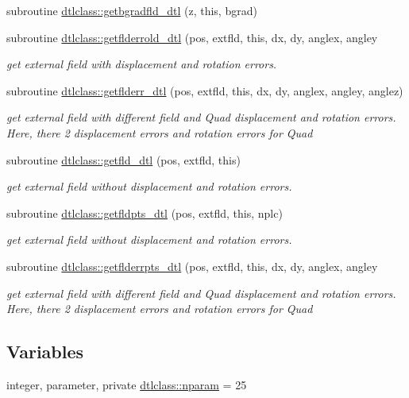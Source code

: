 \begin{DoxyCompactItemize}
subroutine \mbox{\hyperlink{namespacedtlclass_a79f0618eb609338c97470f6f8f05a848}{dtlclass\+::getbgradfld\+\_\+dtl}} (z, this, bgrad)
\item 
subroutine \mbox{\hyperlink{namespacedtlclass_aa42e9d402234d9be025275b620c42326}{dtlclass\+::getflderrold\+\_\+dtl}} (pos, extfld, this, dx, dy, anglex, angley
\begin{DoxyCompactList}\small\item\em get external field with displacement and rotation errors. \end{DoxyCompactList}\item 
subroutine \mbox{\hyperlink{namespacedtlclass_ab866f108c00b307f9e7a55731eadafa4}{dtlclass\+::getflderr\+\_\+dtl}} (pos, extfld, this, dx, dy, anglex, angley, anglez)
\begin{DoxyCompactList}\small\item\em get external field with different field and Quad displacement and rotation errors. Here, there 2 displacement errors and rotation errors for Quad \end{DoxyCompactList}\item 
subroutine \mbox{\hyperlink{namespacedtlclass_a9e97d93c8f7ec49afee134e3ffd3f900}{dtlclass\+::getfld\+\_\+dtl}} (pos, extfld, this)
\begin{DoxyCompactList}\small\item\em get external field without displacement and rotation errors. \end{DoxyCompactList}\item 
subroutine \mbox{\hyperlink{namespacedtlclass_ad87e70265bf1286abf4b2976d8ac37ac}{dtlclass\+::getfldpts\+\_\+dtl}} (pos, extfld, this, nplc)
\begin{DoxyCompactList}\small\item\em get external field without displacement and rotation errors. \end{DoxyCompactList}\item 
subroutine \mbox{\hyperlink{namespacedtlclass_a34e4fef41e0eab9b94f596f73059c2b7}{dtlclass\+::getflderrpts\+\_\+dtl}} (pos, extfld, this, dx, dy, anglex, angley
\begin{DoxyCompactList}\small\item\em get external field with different field and Quad displacement and rotation errors. Here, there 2 displacement errors and rotation errors for Quad \end{DoxyCompactList}\end{DoxyCompactItemize}
\subsection*{Variables}
\begin{DoxyCompactItemize}
\item 
integer, parameter, private \mbox{\hyperlink{namespacedtlclass_adf04761c96168c3dc492c89c72194cea}{dtlclass\+::nparam}} = 25
\end{DoxyCompactItemize}


